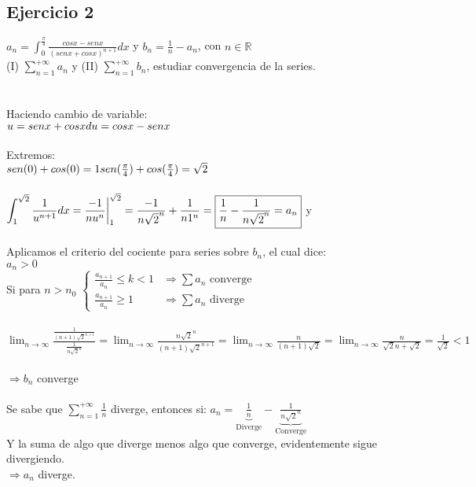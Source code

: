 \documentclass[a4paper,10pt]{article}
\newcommand{\dstr}[1]{\mathbb{#1}}
\newcommand{\RR}{\dstr{R}}
\begin{document}
\subsection*{Ejercicio 2}
$a_n = \displaystyle \int_0^{\frac{\pi}{4}}\frac{cos x - sen x}{(sen x + cos x)^{n+1}} dx$  y  $b_n = \displaystyle \frac{1}{n} - a_n$, con $n \in \RR$\\
(I) $\displaystyle \sum_{n=1}^{+\infty}a_n$ y (II) $\displaystyle \sum_{n=1}^{+\infty}b_n$, estudiar convergencia de la series.\\\\\\
Haciendo cambio de variable:\\
$u = sen x + cos x \\
du = cos x - sen x$\\\\
Extremos:\\
$sen(0) + cos(0) = 1 \\
sen(\frac{\pi}{4}) + cos(\frac{\pi}{4}) = \sqrt{2}$\\\\

$\displaystyle \int_1^{\sqrt{2}}\frac{1}{u^{n+1}} dx = \frac{-1}{n u^n} \bigg|_{1}^{\sqrt{2}} = \frac{-1}{n \sqrt{2}^n} + \frac{1}{n 1^n} = \fbox{$\displaystyle \frac{1}{n} - \frac{1}{n \sqrt{2}^n} = a_n$}$ y \\\\
Aplicamos el criterio del cociente para series sobre $b_n$, el cual dice:\\
$a_n > 0$\\
Si para $n > n_0$ $\left\{ \begin{array}{ll} \frac{a_{n+1}}{a_n} \leq k < 1 & \Rightarrow \sum a_n \text{ converge} \\ \frac{a_{n+1}}{a_n} \geq 1 & \Rightarrow \sum a_n \text{ diverge} \end{array} \right. $\\\\
$ \displaystyle \lim_{n\rightarrow\infty}\frac{\frac{1}{(n+1) \sqrt{2}^{n+1}}}{\frac{1}{n \sqrt{2}^n}} = \lim_{n\rightarrow \infty}\frac{n \sqrt{2}^n}{(n+1) \sqrt{2}^{n+1}} = \lim_{n\rightarrow\infty} \frac{n}{(n+1)\sqrt{2}} = \lim_{n\rightarrow\infty} \frac{n}{\sqrt{2}n + \sqrt{2}} = \frac{1}{\sqrt{2}} < 1$\\\\
$\Rightarrow b_n $ converge\\\\
Se sabe que $\displaystyle \sum_{n=1}^{+\infty} \frac{1}{n}$ diverge, entonces si: $\displaystyle a_n = \underbrace{\frac{1}{n}}_\text{Diverge} - \underbrace{\frac{1}{n \sqrt{2}^n}}_\text{Converge}$\\
Y la suma de algo que diverge menos algo que converge, evidentemente sigue divergiendo.\\
$\Rightarrow a_n$ diverge.
\end{document}
